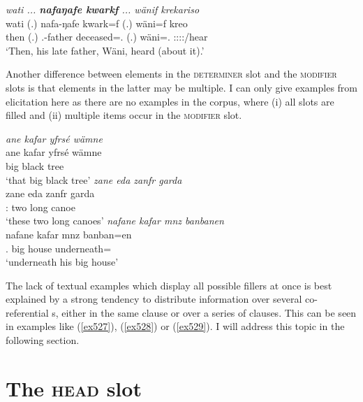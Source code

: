\begin{exe}
	\ex \emph{wati ... \textbf{nafaŋafe kwarkf} ... wänif krekariso}\\
	\gll wati (.) nafa-ŋafe kwark=f (.) wäni=f kreo\\
	then (.) \Third.\Poss-father deceased=\Erg.{\Sg} (.) wäni=\Erg.{\Sg} \Sg:\Sbj:\Irr:\Pfv:\Andat/hear\\
	\trans `Then, his late father, Wäni, heard (about it).'
	\label{ex527}
\end{exe}

Another difference between elements in the \textsc{determiner} slot and the \textsc{modifier} slots is that elements in the latter may be multiple. I can only give examples from elicitation here as there are no examples in the corpus, where (i) all slots are filled and (ii) multiple items occur in the \textsc{modifier} slot.

\begin{exe}
	\ex \label{ex530}
	\begin{xlist}
		\ex \emph{ane kafar yfrsé wämne}\\
		\gll ane kafar yfrsé wämne\\
		{\Dem} big black tree\\
		\trans `that big black tree'
		\label{ex531}
		\ex \emph{zane eda zanfr garda}\\
		\gll zane eda zanfr garda\\
		\Dem:{\Prox} two long canoe\\
		\trans `these two long canoes'
		\label{ex532}
		\ex \emph{nafane kafar mnz banbanen}\\
		\gll nafane kafar mnz banban=en\\
		\Tsg.{\Poss} big house underneath=\Loc\\
		\trans `underneath his big house'
		\label{ex533}
	\end{xlist}
\end{exe}

The lack of textual examples which display all possible fillers at once is best explained by a strong tendency to distribute information over several co-referential s, either in the same clause or over a series of clauses. This can be seen in examples like (\ref{ex527}), (\ref{ex528}) or (\ref{ex529}). I will address this topic in the following section.

\section{The \textsc{head} slot}\label{headslot}

